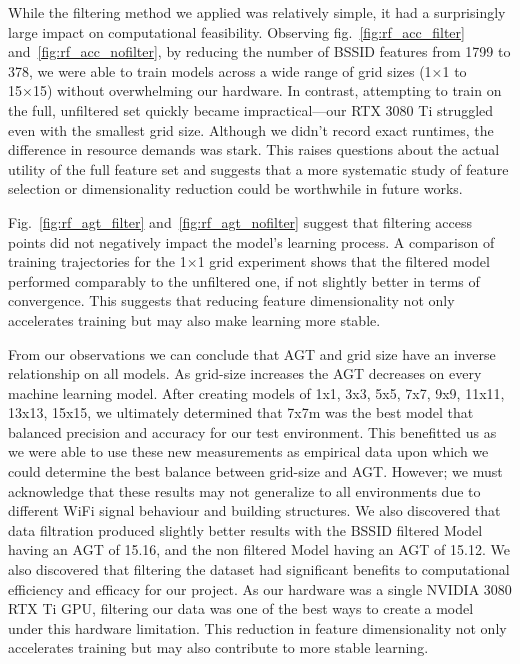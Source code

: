 \documentclass[conference]{IEEEtran}
\begin{document}
	While the filtering method we applied was relatively simple, it had a surprisingly large impact on computational feasibility. Observing fig.~\ref{fig:rf_acc_filter} and~\ref{fig:rf_acc_nofilter}, by reducing the number of BSSID features from 1799 to 378, we were able to train models across a wide range of grid sizes (1×1 to 15×15) without overwhelming our hardware. In contrast, attempting to train on the full, unfiltered set quickly became impractical—our RTX 3080 Ti struggled even with the smallest grid size. Although we didn’t record exact runtimes, the difference in resource demands was stark. This raises questions about the actual utility of the full feature set and suggests that a more systematic study of feature selection or dimensionality reduction could be worthwhile in future works.
	
	Fig.~\ref{fig:rf_agt_filter} and~\ref{fig:rf_agt_nofilter} suggest that filtering access points did not negatively impact the model's learning process. A comparison of training trajectories for the 1×1 grid experiment shows that the filtered model performed comparably to the unfiltered one, if not slightly better in terms of convergence. This suggests that reducing feature dimensionality not only accelerates training but may also make learning more stable.
	
	From our observations we can conclude that AGT and grid size have an inverse relationship on all models. As grid-size increases the AGT decreases on every machine learning model. After creating models of 1x1, 3x3, 5x5, 7x7, 9x9, 11x11, 13x13, 15x15, we ultimately determined that 7x7m was the best model that balanced precision and accuracy for our test environment. This benefitted us as we were able to use these new measurements as empirical data upon which we could determine the best balance between grid-size and AGT. However; we must acknowledge that these results may not generalize to all environments due to different WiFi signal behaviour and building structures. We also discovered that data filtration produced slightly better results with the BSSID filtered Model having an AGT of 15.16, and the non filtered Model having an AGT of 15.12. We also discovered that filtering the dataset had significant benefits to computational efficiency and efficacy for our project. As our hardware was a single NVIDIA 3080 RTX Ti GPU, filtering our data was one of the best ways to create a model under this hardware limitation. This reduction in feature dimensionality not only accelerates training but may also contribute to more stable learning.
	
\end{document}
